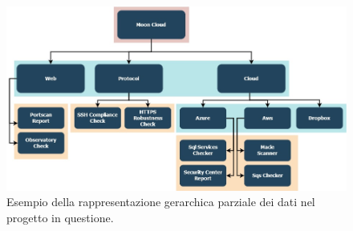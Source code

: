 \begin{figure}[ht!]
    \centering
    \includegraphics[scale=0.55]{images/MC_Rec_Tree.jpg}
    \caption[Rappresentazione gerarchica di dati relativi al progetto]{Esempio della rappresentazione gerarchica parziale dei dati nel progetto in questione.}
    \label{fig:MC_Rec_Tree}
\end{figure}
%
\newpage
%
